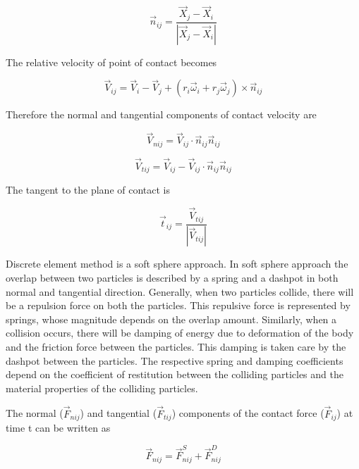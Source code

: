 \begin{equation}
  \label{eq:normal_unit}
  \vec{n}_{ij} = \frac{\vec{X}_{j} - \vec{X}_{i}}{|\vec{X}_{j} - \vec{X}_{i}|}
\end{equation}

The relative velocity of point of contact becomes

\begin{equation}
  \label{eq:relative}
  \vec{V}_{ij} = \vec{V}_{i} - \vec{V}_{j} +
  (r_{i} \vec{\omega}_{i} + r_{j} \vec{\omega}_{j}) \times \vec{n}_{ij}
\end{equation}

Therefore the normal and tangential components of contact velocity are

\begin{equation}
  \label{eq:normal_vel}
  \vec{V}_{nij} = \vec{V}_{ij} \cdot \vec{n}_{ij} \vec{n}_{ij}
\end{equation}

\begin{equation}
  \label{eq:tang_vel}
  \vec{V}_{tij} = \vec{V}_{ij} - \vec{V}_{ij} \cdot \vec{n}_{ij} \vec{n}_{ij}
\end{equation}

The tangent to the plane of contact is

\begin{equation}
  \label{eq:tang_unit}
  \vec{t}_{ij} = \frac{\vec{V}_{tij}}{|\vec{V}_{tij}|}
\end{equation}


Discrete element method is a soft sphere approach. In soft sphere
approach the overlap between two particles is described by a spring
and a dashpot in both normal and tangential direction. Generally, when
two particles collide, there will be a repulsion force on both the
particles. This repulsive force is represented by springs, whose
magnitude depends on the overlap amount. Similarly, when a collision
occurs, there will be damping of energy due to deformation of the body
and the friction force between the particles. This damping is taken
care by the dashpot between the particles. The respective spring and
damping coefficients depend on the coefficient of restitution between
the colliding particles and the material properties of the colliding
particles.


The normal ($\vec{F}_{nij}$) and tangential ($\vec{F}_{tij}$)
components of the contact force ($\vec{F}_{ij}$) at time t can be
written as

\begin{equation}
  \label{eq:normal_force}
  \vec{F}_{nij} =  \vec{F}_{nij}^S +  \vec{F}_{nij}^D
\end{equation}

